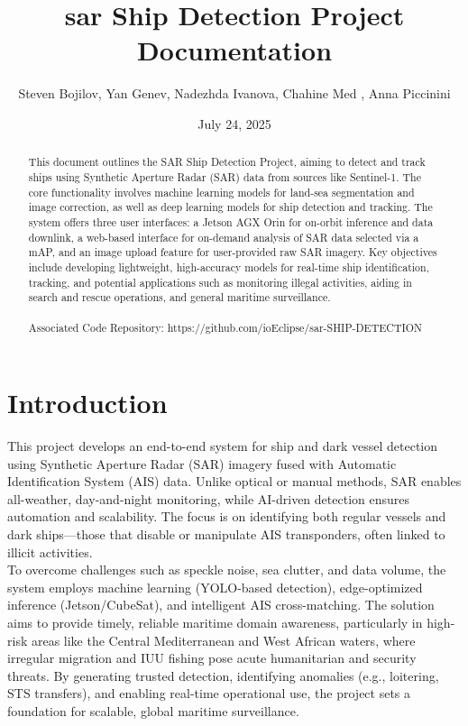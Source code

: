 \documentclass{article}
\title{\acrshort{sar} Ship Detection Project Documentation}
\author{Steven Bojilov, Yan Genev, Nadezhda Ivanova, Chahine Med , Anna Piccinini}
\date{July 24, 2025}
\begin{document}
	\sloppy
	
	\maketitle
	
	\begin{abstract}
		This document outlines the SAR Ship Detection Project, aiming to detect and track ships using Synthetic Aperture Radar (SAR) data from sources like Sentinel-1. 
		The core functionality involves machine learning models for land-sea segmentation and image correction, as well as deep learning models for ship detection and tracking. The system offers three user interfaces: a Jetson AGX Orin for on-orbit inference and data downlink, a web-based interface for on-demand analysis of SAR data selected via a mAP, and an image upload feature for user-provided raw SAR imagery.
		 Key objectives include developing lightweight, high-accuracy models for real-time ship identification, tracking, and potential applications such as monitoring illegal activities, aiding in search and rescue operations, and general maritime surveillance.
		 \\\\Associated Code Repository: https://github.com/ioEclipse/\acrshort{sar}-SHIP-DETECTION 
		
		
	\end{abstract}
	\newpage
	\tableofcontents
	\newpage
	\section{Introduction}
	This project develops an end-to-end system for ship and dark vessel detection using Synthetic Aperture Radar (SAR) imagery fused with Automatic Identification System (AIS) data. Unlike optical or manual methods, SAR enables all-weather, day-and-night monitoring, while AI-driven detection ensures automation and scalability. The focus is on identifying both regular vessels and dark ships—those that disable or manipulate AIS transponders, often linked to illicit activities. \\
	To overcome challenges such as speckle noise, sea clutter, and data volume, the system employs machine learning (YOLO-based detection), edge-optimized inference (Jetson/CubeSat), and intelligent AIS cross-matching. The solution aims to provide timely, reliable maritime domain awareness, particularly in high-risk areas like the Central Mediterranean and West African waters, where irregular migration and IUU fishing pose acute humanitarian and security threats. By generating trusted detection, identifying anomalies (e.g., loitering, STS transfers), and enabling real-time operational use, the project sets a foundation for scalable, global maritime surveillance.
\end{document}
